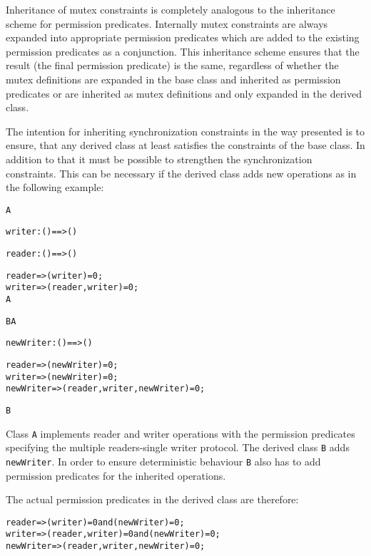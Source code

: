 \documentclass[\pformat,12pt]{article}
\begin{document}
Inheritance of mutex constraints is completely analogous to the
inheritance scheme for  permission predicates. Internally mutex
constraints are always expanded into appropriate permission predicates
which are added to the existing permission predicates as a
conjunction. This inheritance scheme ensures that the result (the
final permission predicate) is the same, regardless of whether the mutex
definitions are expanded in the base class and inherited as permission
predicates or are inherited as mutex definitions and only expanded in
the derived class.

The intention for inheriting synchronization constraints in the way
presented is to ensure, that any derived class at least
satisfies the constraints of the base class.  In addition to that it
must be possible to strengthen the synchronization constraints. This
can be necessary if the derived class adds new operations as in the
following example:
\begin{alltt}
   A 
    
      writer: () ==> () 
    
      reader: () ==> () 
    
        reader => (writer) = 0; 
        writer => (reader, writer) = 0; 
   A

   B  A 

      newWriter: () ==> () 

        reader => (newWriter) = 0; 
        writer => (newWriter) = 0; 
        newWriter => (reader, writer, newWriter) = 0; 

   B
\end{alltt}

Class \texttt{A} implements reader and writer operations with the permission
predicates specifying the multiple readers-single writer protocol. The
derived class \texttt{B} adds \texttt{newWriter}. In order to ensure
deterministic behaviour \texttt{B} also has to add permission
predicates for the inherited operations.

The actual permission predicates in the derived class
are therefore:
\begin{alltt}
   reader => (writer)=0 and (newWriter)=0; 
   writer => (reader, writer)=0 and (newWriter)=0;
   newWriter => (reader, writer, newWriter)=0;
\end{alltt}
\end{document}
